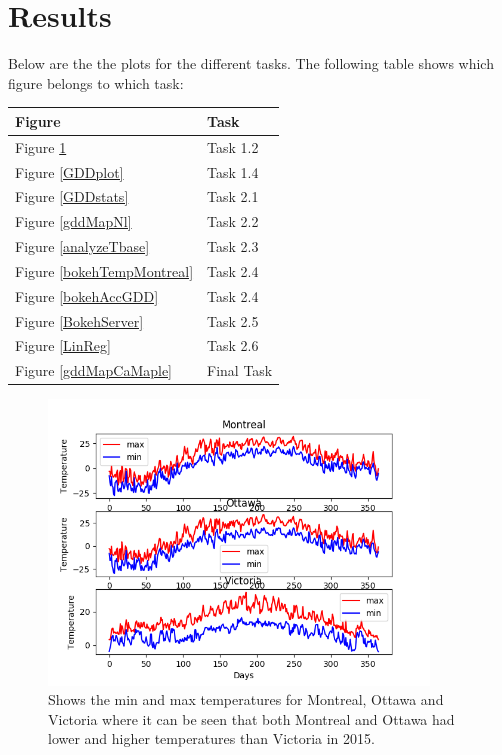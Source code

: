 \documentclass[12pt]{article}
\begin{document}
\pagebreak
\section{Results}
Below are the the plots for the different tasks. 
The following table shows which figure belongs to which task:
\begin{center}
\begin{tabular}{l l}
Figure & Task\\
\hline
Figure \ref{MinMaxplot} & Task 1.2\\
Figure \ref{GDDplot}    & Task 1.4\\
Figure \ref{GDDstats}  & Task 2.1\\
Figure \ref{gddMapNl} & Task 2.2\\
Figure \ref{analyzeTbase} & Task 2.3\\
Figure \ref{bokehTempMontreal} & Task 2.4\\
Figure \ref{bokehAccGDD} & Task 2.4\\
Figure \ref{BokehServer} & Task 2.5\\
Figure \ref{LinReg} & Task 2.6\\
Figure \ref{gddMapCaMaple} & Final Task
\end{tabular}
\end{center}

	\begin{figure}[!htbp]
		\centering
		\includegraphics[width=0.9\textwidth]{./Output/CompareMaxMinTemp.png} 
		\caption{\scriptsize Shows the min and max temperatures for Montreal, Ottawa and Victoria 
		where it can be seen that both Montreal and Ottawa had lower and higher temperatures than 
		Victoria in 2015.}\label{MinMaxplot}		  
	\end{figure}
\end{document}
